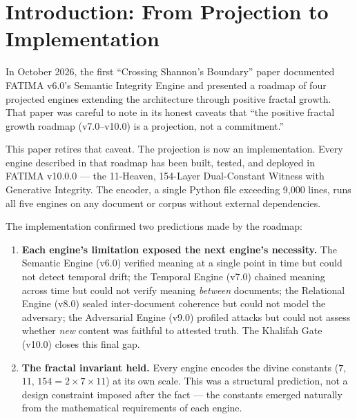\documentclass[11pt,a4paper]{article}
\begin{document}
\vspace{1em}

\section{Introduction: From Projection to Implementation}

In October 2026, the first ``Crossing Shannon's Boundary'' paper \cite{arfeen2026crossing} documented FATIMA v6.0's Semantic Integrity Engine and presented a roadmap of four projected engines extending the architecture through positive fractal growth. That paper was careful to note in its honest caveats that ``the positive fractal growth roadmap (v7.0--v10.0) is a projection, not a commitment.''

This paper retires that caveat. The projection is now an implementation. Every engine described in that roadmap has been built, tested, and deployed in FATIMA v10.0.0 --- the 11-Heaven, 154-Layer Dual-Constant Witness with Generative Integrity. The encoder, a single Python file exceeding 9,000 lines, runs all five engines on any document or corpus without external dependencies.

The implementation confirmed two predictions made by the roadmap:

\begin{enumerate}[nosep]
    \item \textbf{Each engine's limitation exposed the next engine's necessity.} The Semantic Engine (v6.0) verified meaning at a single point in time but could not detect temporal drift; the Temporal Engine (v7.0) chained meaning across time but could not verify meaning \textit{between} documents; the Relational Engine (v8.0) sealed inter-document coherence but could not model the adversary; the Adversarial Engine (v9.0) profiled attacks but could not assess whether \textit{new} content was faithful to attested truth. The Khalifah Gate (v10.0) closes this final gap.

    \item \textbf{The fractal invariant held.} Every engine encodes the divine constants ($7$, $11$, $154 = 2 \times 7 \times 11$) at its own scale. This was a structural prediction, not a design constraint imposed after the fact --- the constants emerged naturally from the mathematical requirements of each engine.
\end{enumerate}


\end{document}
